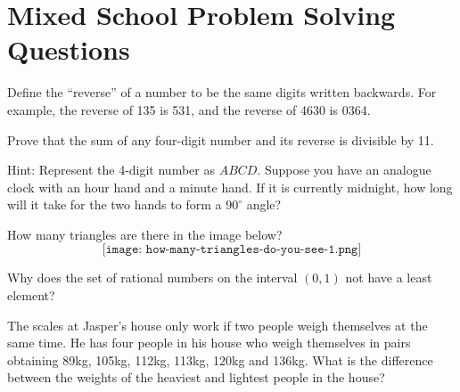\documentclass[a4paper,12pt,addpoints]{exam}
\begin{document}
\section*{Mixed School Problem Solving Questions}
\begin{questions}
  \question Define the “reverse” of a number to be the same digits written backwards. For example, the reverse of 135 is 531, and the reverse of 4630 is 0364. 

Prove that the sum of any four-digit number and its reverse is divisible by 11. 

Hint: Represent the 4-digit number as $ABCD$. 
    \question Suppose you have an analogue clock with an hour hand and a minute hand. If it is currently midnight, how long will it take for the two hands to form a $90^{\circ}$ angle? 

    \question How many triangles are there in the image below?
    \[  \texttt{[image: how-many-triangles-do-you-see-1.png]}\]

      \question 

      \question Why does the set of rational numbers on the interval \((0,1)\) not have a least element?

      \question

      \question  The scales at Jasper’s house only work if two people weigh themselves at
    the same time. He has four people in his house who weigh themselves in
    pairs obtaining 89kg, 105kg, 112kg, 113kg, 120kg and 136kg. What is the
    difference between the weights of the heaviest and lightest people in the
    house?

      
\end{questions}
  
\end{document}
